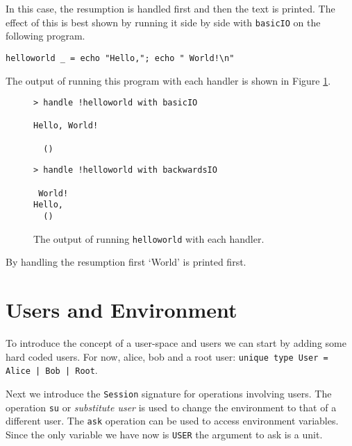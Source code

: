 \documentclass[logo,bsc,singlespacing,parskip]{infthesis}
\begin{document}
In this case, the resumption is handled first and then the text is printed. The
effect of this is best shown by running it side by side with \texttt{basicIO}
on the following program.

\begin{lstlisting}[language=unison]
helloworld _ = echo "Hello,"; echo " World!\n"
\end{lstlisting}

The output of running this program with each handler is shown in Figure \ref{fig:sidebyside}.

\begin{figure}[h]
\begin{minipage}{0.5\textwidth}

\begin{lstlisting}[style=terminal]
> handle !helloworld with basicIO

Hello, World!

  ()
\end{lstlisting}

\end{minipage}%
\begin{minipage}{0.5\textwidth}

\begin{lstlisting}[style=terminal]
 > handle !helloworld with backwardsIO

 World!
Hello,
  ()
\end{lstlisting}
\end{minipage}
\caption{The output of running \texttt{helloworld} with each handler.}
  \label{fig:sidebyside}
\end{figure}

By handling the resumption first `World' is printed first.

\section{Users and Environment}
\label{userspace}

To introduce the concept of a user-space and users we can start by adding some
hard coded users. For now, alice, bob and a root user: \texttt{unique type User
= Alice | Bob | Root}.

Next we introduce the \texttt{Session} signature for operations involving
users. The operation \texttt{su} or \emph{substitute user} is used to change
the environment to that of a different user. The \texttt{ask} operation can be
used to access environment variables. Since the only variable we have now is
\texttt{USER} the argument to ask is a unit.
\end{document}
